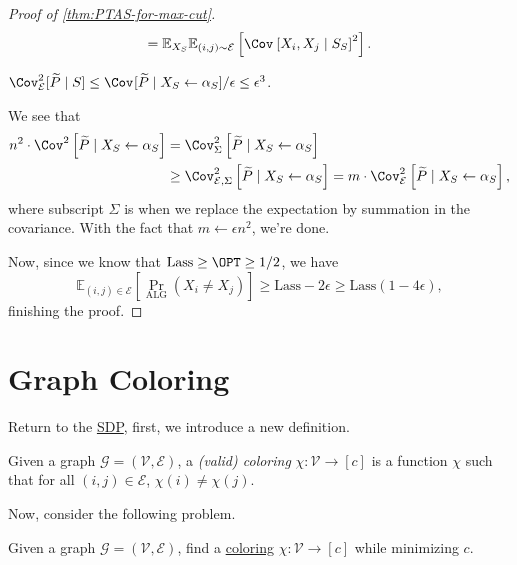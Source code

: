 \begin{proof}[Proof of \autoref{thm:PTAS-for-max-cut}]
\[		= \mathbb{E}_{X_S} \mathbb{E}_{(i, j)\sim \mathcal{E} }\left[ \Cov_{}\left[X_i , X_j \mid S_S \right]^{2}\right].
	\]
	\begin{claim}
		\(\Cov_{\mathcal{E} }^2 [ \widetilde{P} \mid S ] \leq \Cov_{}[\widetilde{P} \mid X_S \gets \alpha _S ] / \epsilon \leq \epsilon ^3 \).
	\end{claim}
	\begin{explanation}
		We see that
		\[
			\begin{split}
				n^2\cdot \Cov_{}^2\left[\widetilde{P} \mid X_S \gets \alpha _S \right]
				 & = \Cov_{\Sigma }^2\left[\widetilde{P} \mid X_S\gets \alpha _S \right]                  \\
				 & \geq \Cov_{\mathcal{E} , \Sigma }^2\left[\widetilde{P} \mid X_S\gets \alpha _S \right]
				= m \cdot \Cov_{\mathcal{E} }^2\left[\widetilde{P} \mid X_S \gets \alpha _S \right],
			\end{split}
		\]
		where subscript \(\Sigma \) is when we replace the expectation by summation in the covariance. With the fact that \(m\gets \epsilon n^2\), we're done.
	\end{explanation}
	Now, since we know that \(\mathrm{Lass} \geq \OPT \geq 1 / 2\), we have
	\[
		\mathbb{E}_{(i, j)\in \mathcal{E} }\left[ \Pr_{\mathrm{ALG}}(X_i \neq X_j) \right]
		\geq \mathrm{Lass} - 2 \epsilon \geq \mathrm{Lass}(1 - 4 \epsilon ),
	\]
	finishing the proof.
\end{proof}

\section{Graph Coloring}
Return to the \hyperref[def:SDP]{SDP}, first, we introduce a new definition.

\begin{definition}[Coloring]\label{def:coloring}
	Given a graph \(\mathcal{G} =(\mathcal{V} , \mathcal{E} )\), a \emph{(valid) coloring} \(\chi \colon \mathcal{V} \to [c]\) is a function \(\chi \) such that for all \((i, j)\in \mathcal{E} \), \(\chi (i) \neq \chi (j)\).
\end{definition}

Now, consider the following problem.

\begin{problem}\label{prb:graph-coloring}
Given a graph \(\mathcal{G} =(\mathcal{V} , \mathcal{E} )\), find a \hyperref[def:coloring]{coloring} \(\chi \colon \mathcal{V} \to [c]\) while minimizing \(c\).
\end{problem}

